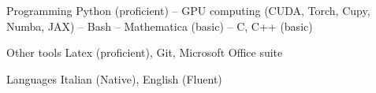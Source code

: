 


\begin{cvskills}


\cvskill
{Programming} %
{Python (proficient) -- GPU computing (CUDA, Torch, Cupy, Numba, JAX) -- Bash -- Mathematica (basic) -- C, C++ (basic)} %


\cvskill
{Other tools} %
{Latex (proficient), Git, Microsoft Office suite} %


\cvskill
{Languages} %
{Italian (Native), English (Fluent)} %


\end{cvskills}
